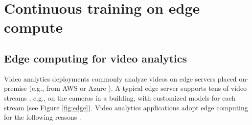
\section{Continuous training on edge compute}
\label{sec:background}



\subsection{Edge computing for video analytics}
\label{subsec:edge}

Video analytics deployments commonly analyze videos on edge servers placed on-premise (e.g., from AWS \cite{aws-outposts} or Azure \cite{azure-ase}). %
A typical edge server supports tens of video streams \cite{videoedge}, e.g., on the cameras in a building, with customized models for each stream \cite{rocket-github} (see Figure \ref{fig:edge}).%
Video analytics applications adopt edge computing for the following reasons %
\cite{getmobile, edgevideo-1, ieee-computer}. 

